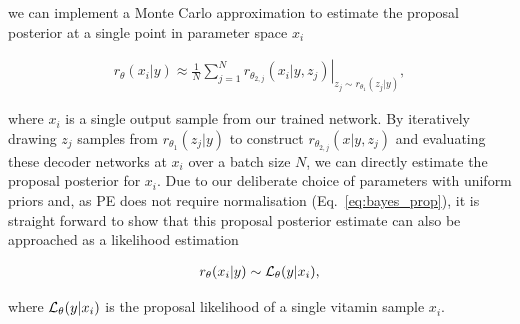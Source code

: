 \documentclass[a4paper]{jpconf}
\begin{document}
we can implement a Monte Carlo approximation to estimate the proposal posterior at a single point in parameter space $x_i$

\begin{align}\label{eq:monte_approx2}
r_{\theta}(x_i|y)\approx\frac{1}{N}\sum^{N}_{j=1}\left.r_{\theta_{2,j}}(x_i|y,z_j)\right|_{z_j\sim r_{\theta_1}(z_j|y)},
\end{align}

where $x_i$ is a single output sample from our trained network. By iteratively drawing $z_j$ samples from $r_{\theta_1}(z_j|y)$ to construct $r_{\theta_{2,j}}(x|y,z_j)$ and evaluating these decoder networks at $x_i$ over a batch size $N$, we can directly estimate the proposal posterior for $x_i$. Due to our deliberate choice of parameters with uniform priors and, as \ac{PE} does not require normalisation (Eq.~\ref{eq:bayes_prop}), it is straight forward to show that this proposal posterior estimate can also be approached as a likelihood estimation

\begin{align}\label{eq:post_like}
r_{\theta}(x_i|y) \sim {\cal L}_{\theta}(y|x_i),
\end{align}

where ${\cal L}_\theta(y|x_i)$ is the proposal likelihood of a single vitamin sample $x_i$.
\end{document}
